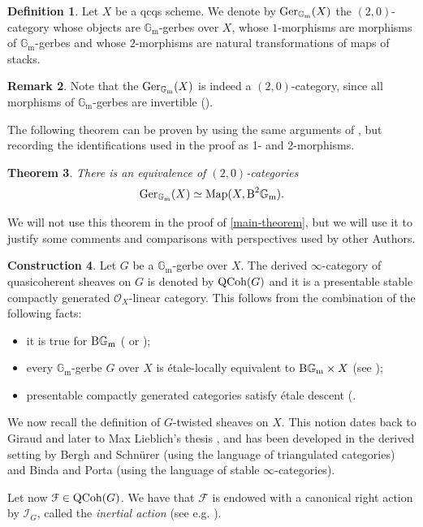 \documentclass[11pt, twoside]{article} %
\numberwithin{equation}{section}
\theoremstyle{plain}
\newtheorem{thm}{Theorem}[section]
\theoremstyle{definition}
\newtheorem{defin}[thm]{Definition}
\newtheorem{rem}[thm]{Remark}
\newtheorem{construction}[thm]{Construction}
\newcommand{\B}{\textup{B}}
\newcommand{\Map}{\textup{Map}}
\newcommand{\Gm}{\mathbb G_{\mathrm{m}}}
\newcommand{\QCoh}{\textup{QCoh}}
\newcommand{\BGm}{\textup{B}\Gm}
\newcommand{\cO}{{\mathcal O}}
\newcommand{\cF}{{\mathcal F}}
\newcommand{\Ger}{\textup{Ger}}
\newcommand{\cI}{\mathcal I}
\begin{document}
\begin{defin}
    Let $X$ be a qcqs scheme. We denote by $\Ger_{\Gm}(X)$ the $(2,0)$-category whose objects are $\Gm$-gerbes over $X$, whose $1$-morphisms are morphisms of $\Gm$-gerbes and whose $2$-morphisms are natural transformations of maps of stacks.
\end{defin}
\begin{rem}
    Note that the $\Ger_{\Gm}(X)$ is indeed a $(2,0)$-category, since all morphisms of $\Gm$-gerbes are invertible (\cite[Lemma 12.2.4]{Olsson}).
\end{rem}

The following theorem can be proven by using the same arguments of \cite[Theorem 12.2.8]{Olsson}, but recording the identifications used in the proof as 1- and 2-morphisms.
\begin{thm}\label{gerbes-H2}
    There is an equivalence of $(2,0)$-categories
    $$\Ger_{\Gm}(X)\simeq \Map(X,\B^2\Gm).$$
\end{thm}

We will not use this theorem in the proof of \cref{main-theorem}, but we will use it to justify some comments and comparisons with perspectives used by other Authors.
     	
		
  \begin{construction}
     Let $G$ be a $\Gm$-gerbe over $X$. The derived $\infty$-category of quasicoherent sheaves on $G$ is denoted by $\QCoh(G)$ and it is a presentable stable compactly generated $\cO_X$-linear category. This follows from the combination of the following facts:
     \begin{itemize}\item it is true for $\BGm$ (\cite[Example 8.6]{Hall-Rydh} or \cite[Remark 5.8]{BP});
     \item every $\Gm$-gerbe $G$ over $X$ is \'etale-locally equivalent to $\BGm\times X$ (see \cite[\texttt{Tag 06QG}]{Stacks}); 
     \item presentable compactly generated categories satisfy \'etale descent (\cite[Theorem D.5.3.1]{SAG}.\end{itemize}
     We now recall the definition of $G$-twisted sheaves on $X$. This notion dates back to Giraud \cite{Gir} and later to Max Lieblich's thesis \cite{Lieblich}, and has been developed in the derived setting by Bergh and Schn\"urer \cite{Bergh-Schnurer} (using the language of triangulated categories) and Binda and Porta \cite{BP} (using the language of stable $\infty$-categories).
	
   
   Let now $\cF\in \QCoh(G)$. We have that $\cF$ is endowed with a canonical right action by $\cI_{G}$, called the \textit{inertial action} (see e.g. \cite[Section 3]{Bergh-Schnurer}).
	\end{construction}
	
\end{document}
